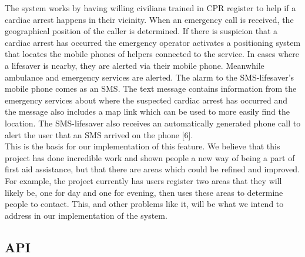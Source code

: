 \documentclass{article}
\begin{document}
The system works by having willing civilians trained in CPR register to help if a cardiac arrest happens in their vicinity. When an emergency call is received, the geographical position of the caller is determined. If there is suspicion that a cardiac arrest has occurred the emergency operator activates a positioning system that locates the mobile phones of helpers connected to the service. In cases where a lifesaver is nearby, they are alerted via their mobile phone. Meanwhile ambulance and emergency services are alerted. The alarm to the SMS-lifesaver’s mobile phone comes as an SMS. The text message contains information from the emergency services about where the suspected cardiac arrest has occurred and the message also includes a map link which can be used to more easily find the location. The SMS-lifesaver also receives an automatically generated phone call to alert the user that an SMS arrived on the phone [6].\\

This is the basis for our implementation of this feature. We believe that this project has done incredible work and shown people a new way of being a part of first aid assistance, but that there are areas which could be refined and improved. For example, the project currently has users register two areas that they will likely be, one for day and one for evening, then uses these areas to determine people to contact. This, and other problems like it, will be what we intend to address in our implementation of the system.\\

    \subsection{API}
    
\end{document}
